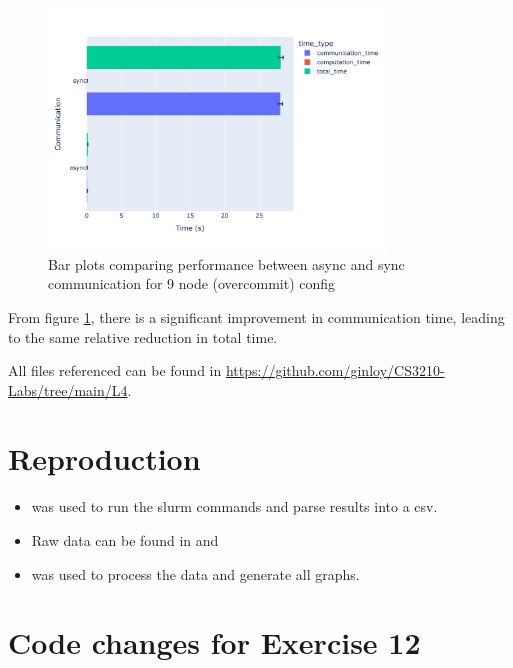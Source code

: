 \documentclass[11pt]{article}
\begin{document}
\begin{figure}[H]
  \begin{center}
    \includegraphics[width=0.8\textwidth]{figures/async.png}
  \end{center}
  \caption{Bar plots comparing performance between async and sync communication for 9 node (overcommit) config}\label{fig:async}
\end{figure}

From figure \ref{fig:async},
there is a significant improvement in communication time, leading to the same relative reduction in total time.

\clearpage
\begin{appendices}
  All files referenced can be found in \url{https://github.com/ginloy/CS3210-Labs/tree/main/L4}.
  \section{Reproduction}

  \begin{itemize}
    \item \href{https://github.com/ginloy/CS3210-Labs/blob/main/L4/test.sh}{} was used to run the slurm commands and parse results into a csv.

    \item Raw data can be found in \href{https://github.com/ginloy/CS3210-Labs/blob/main/L4/results2.csv}{} and
      \href{https://github.com/ginloy/CS3210-Labs/blob/main/L4/results-async.csv}{}
      
    \item \href{https://github.com/ginloy/CS3210-Labs/blob/main/L4/graphs.ipynb}{} was used to process the data and generate all graphs.
  \end{itemize}

  \section{Code changes for Exercise 12}
  \href{https://github.com/ginloy/CS3210-Labs/blob/main/L4/ex12.patch}{}  

\end{appendices}
\end{document}
